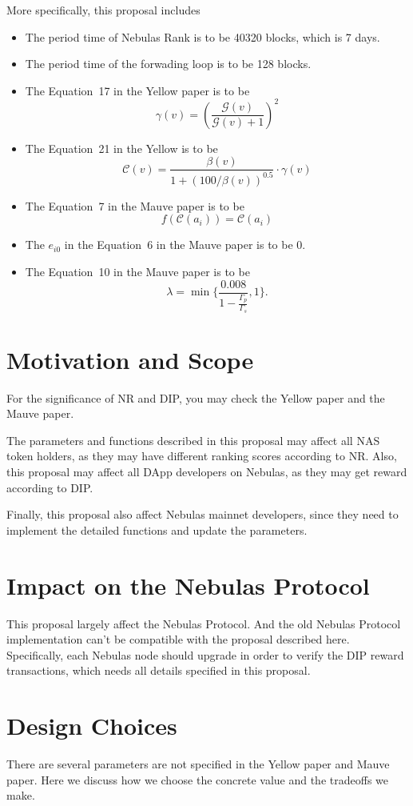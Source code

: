 \documentclass[11pt]{article}
\begin{document}
More specifically, this proposal includes
\begin{itemize}
    \item The period time of Nebulas Rank is to be 40320 blocks, which is 7 days.
    \item The period time of the forwading loop is to be 128 blocks.
    \item The Equation~17 in the Yellow paper is to be
        \[
\gamma(v) = (\frac{\mathcal{G}(v)}{\mathcal{G}(v) + 1})^{2}
        \]
    \item The Equation~21 in the Yellow is to be \[
        \mathcal{C}(v) =  \frac{\beta(v)}{1+(100/\beta(v))^{0.5}} \cdot
        \gamma(v)
      \]
    \item The Equation~7 in the Mauve paper is to be \[
f(\mathcal{C}(a_i))=\mathcal{C}(a_i)
\]
\item The $e_{i0}$ in the Equation~6 in the Mauve paper is to be 0.
  \item The  Equation~10 in the Mauve paper is to be
    \[
\lambda=\min\{\frac{0.008}{1-\frac{\Gamma_p}{\Gamma_s }},1\}.
    \]

\end{itemize}


\section{Motivation and Scope}
For the significance of NR and DIP, you may check the Yellow paper and the
Mauve paper.

The parameters and functions described in this proposal may affect all NAS
token holders, as they may have different ranking scores according to NR. Also,
this proposal may affect all DApp developers on Nebulas, as they may get reward
according to DIP.

Finally, this proposal also affect Nebulas mainnet developers, since they need
to implement the detailed functions and update the parameters.


\section{Impact on the Nebulas Protocol}
This proposal largely affect the Nebulas Protocol. And the old Nebulas Protocol
implementation can't be compatible with the proposal described here.
Specifically, each Nebulas node should upgrade in order to verify the DIP reward
transactions, which needs all details specified in this proposal.

\section{Design Choices}
There are several parameters are not specified in the Yellow paper and Mauve
paper. Here we discuss how we choose the concrete value and the tradeoffs we
make.
\end{document}
